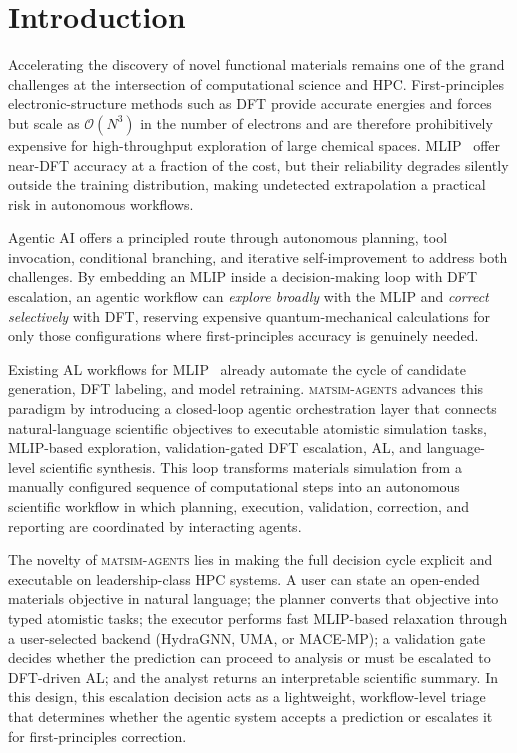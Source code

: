 \documentclass[conference]{IEEEtran}
\def\ac#1{#1}%
\def\acs#1{#1}%
\def\acp#1{#1}%
\def\Acp#1{#1}%
\begin{document}
\section{Introduction}
\label{sec:intro}

Accelerating the discovery of novel functional materials remains one of the
grand challenges at the intersection of computational science and
\acs{HPC}. First-principles electronic-structure methods such
as \acs{DFT} provide accurate energies and forces but scale as $\mathcal{O}(N^3)$ in
the number of electrons and are therefore prohibitively expensive for
high-throughput exploration of large chemical spaces. \Acp{MLIP}~\cite{behler2007,bartok2010,batzner2022} offer
near-\acs{DFT} accuracy at a fraction of the cost, but their reliability degrades
silently outside the training distribution, making undetected extrapolation a
practical risk in autonomous workflows.

Agentic \acs{AI} offers a principled route through autonomous planning, tool invocation,
conditional branching, and iterative self-improvement to address both challenges. By embedding an \ac{MLIP} inside a decision-making
loop with \acs{DFT} escalation, an
agentic workflow can \emph{explore broadly} with the \acs{MLIP} and \emph{correct
selectively} with \acs{DFT}, reserving expensive quantum-mechanical calculations for
only those configurations where first-principles accuracy is genuinely needed.

Existing \acs{AL} workflows for \acp{MLIP}~\cite{smith2018,vandermause2020,
podryabinkin2017} already automate the cycle of candidate generation, \acs{DFT}
labeling, and model retraining. \textsc{matsim-agents} advances this paradigm
by introducing a closed-loop agentic orchestration layer that connects
natural-language scientific objectives to executable atomistic simulation tasks,
\acs{MLIP}-based exploration, validation-gated \acs{DFT} escalation,
\acs{AL}, and language-level scientific synthesis. This loop transforms
materials simulation from a manually configured sequence of computational steps
into an autonomous scientific workflow in which planning, execution,
validation, correction, and reporting are coordinated by interacting agents.

The novelty of \textsc{matsim-agents} lies in making the full decision cycle
explicit and executable on leadership-class \acs{HPC} systems. A user can state an
open-ended materials objective in natural language; the planner converts that
objective into typed atomistic tasks; the executor performs fast \acs{MLIP}-based
relaxation through a user-selected backend (HydraGNN, UMA, or MACE-MP); a validation gate
decides whether the prediction can proceed to
analysis or must be escalated to \ac{DFT}-driven \acs{AL}; and the analyst
returns an interpretable scientific summary. In this design, this escalation
decision acts as a lightweight, workflow-level triage that determines
whether the agentic system accepts a prediction or escalates it for first-principles correction.
\end{document}
